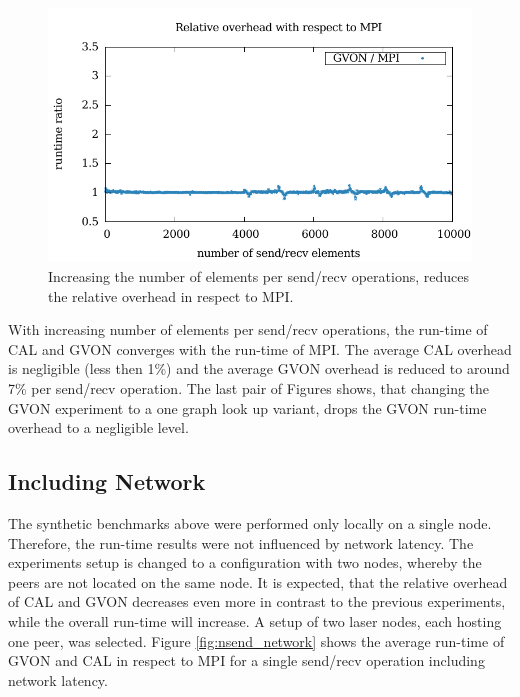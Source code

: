 \begin{figure}[H]
\begin{minipage}[t]{0.5\textwidth}
    \includegraphics[width=\textwidth]{plots/50_nsize_one_lookup_overhead_gvon_laser}
  \end{minipage}%
  \caption{Increasing the number of elements per send/recv operations,
    reduces the relative overhead in respect to MPI.}
  \label{fig:nsize_kepler}
\end{figure}

\noindent With increasing number of elements per send/recv operations,
the run-time of CAL and GVON converges with the run-time of MPI. The
average CAL overhead is negligible (less then 1\%) and the average
GVON overhead is reduced to around 7\% per send/recv operation. The
last pair of Figures shows, that changing the GVON experiment to a one
graph look up variant, drops the GVON run-time overhead to a
negligible level.

\subsection*{Including Network}
The synthetic benchmarks above were performed only locally on a single node.
Therefore, the run-time results were not influenced by network latency.
The experiments setup is changed to a configuration with two
nodes, whereby the peers are not located on the same node. It is
expected, that the relative overhead of CAL and GVON decreases even
more in contrast to the previous experiments, while the overall
run-time will increase.  A setup of two laser nodes, each hosting one
peer, was selected.  Figure \ref{fig:nsend_network} shows the average
run-time of GVON and CAL in respect to MPI for a single send/recv
operation including network latency.

